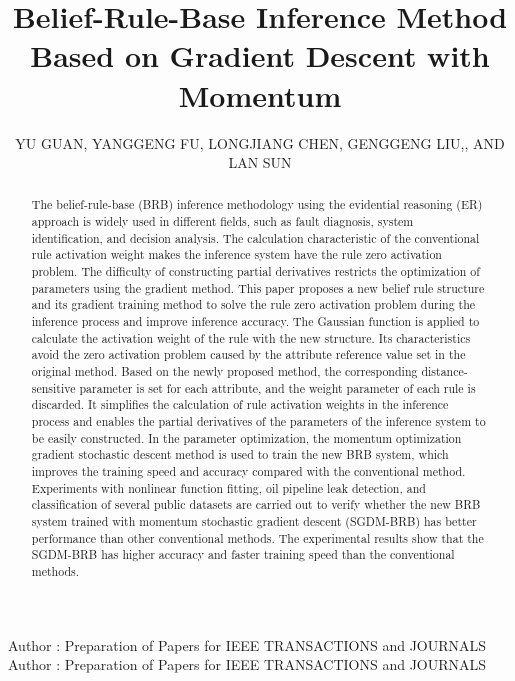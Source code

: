\documentclass{ieeeaccess}
\begin{document}

\title{Belief-Rule-Base Inference Method Based on Gradient Descent with Momentum}
\author{\uppercase{Yu Guan},
    \uppercase{YangGeng Fu},
    \uppercase{LongJiang Chen},
    \uppercase{Genggeng Liu},,
    \uppercase{and Lan Sun}}
\address{College of Mathematics and Computer Science, Fuzhou University, Fuzhou 350116, China}

\markboth
{Author \headeretal: Preparation of Papers for IEEE TRANSACTIONS and JOURNALS}
{Author \headeretal: Preparation of Papers for IEEE TRANSACTIONS and JOURNALS}


\begin{abstract}

    The belief-rule-base (BRB) inference methodology using the evidential reasoning (ER) approach is widely used in different fields,
    such as fault diagnosis, system identification, and decision analysis.
    The calculation characteristic of the conventional rule activation weight makes the inference system have the rule zero activation problem.
    The difficulty of constructing partial derivatives restricts the optimization of parameters using the gradient method.
    This paper proposes a new belief rule structure and its gradient training method
    to solve the rule zero activation problem during the inference process and improve inference accuracy.
    The Gaussian function is applied to calculate the activation weight of the rule with the new structure.
    Its characteristics avoid the zero activation problem caused by the attribute reference value set in the original method.
    Based on the newly proposed method, the corresponding distance-sensitive parameter is set for each attribute, and the weight parameter of each rule is discarded.
    It simplifies the calculation of rule activation weights in the inference process and enables the partial derivatives of the parameters of the inference system to be easily constructed.
    In the parameter optimization, the momentum optimization gradient stochastic descent method is used to train the new BRB system, which improves the training speed and accuracy compared with the conventional method.
    Experiments with nonlinear function fitting, oil pipeline leak detection, and classification of several public datasets are carried out to verify whether
    the new BRB system trained with momentum stochastic gradient descent (SGDM-BRB) has better performance than other conventional methods.
    The experimental results show that the SGDM-BRB has higher accuracy and faster training speed than the conventional methods.

\end{abstract}
\end{document}
